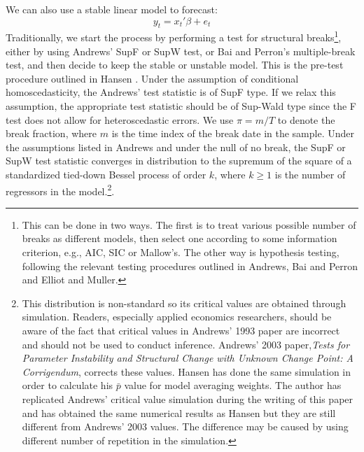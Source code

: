 We can also use a stable linear model to forecast:
\begin{equation}
	y_t = x_t'\beta + e_t
\end{equation}
Traditionally, we start the process by performing a test for structural breaks\footnote{This can be done in two ways. The first is to treat various possible number of breaks as different models, then select one according to some information criterion, e.g., AIC, SIC or Mallow's. The other way is hypothesis testing, following the relevant testing procedures outlined in Andrews\cite{andrews93}, Bai and Perron\cite{bai_perron98} and Elliot and Muller\cite{elliott_muller_RES2006}. }, either by using Andrews' SupF or SupW test, or Bai and Perron's multiple-break test, and then decide to keep the stable or unstable model. This is the pre-test procedure outlined in Hansen \cite{hansen2009averaging}. Under the assumption of conditional homoscedasticity, the Andrews' test statistic is of SupF type. If we relax this assumption, the appropriate test statistic should be of Sup-Wald type since the F test does not allow for heteroscedastic errors. We use $\pi = m/T$ to denote the break fraction, where $m$ is the time index of the break date in the sample. Under the assumptions listed in Andrews \cite{andrews93} and under the null of no break, the SupF or SupW test statistic converges in distribution to the supremum of the square of a standardized tied-down Bessel process of order $k$, where $k \geq 1$ is the number of regressors in the model.\footnote{This distribution is non-standard so its critical values are obtained through simulation. Readers, especially applied economics researchers, should be aware of the fact that critical values in Andrews' 1993 paper are incorrect and should not be used to conduct inference. Andrews' 2003 paper,\emph{Tests for Parameter Instability and Structural Change with Unknown Change Point: A Corrigendum}, corrects these values. Hansen \cite{hansen2009averaging} has done the same simulation in order to calculate his $\bar{p}$ value for model averaging weights. The author has replicated Andrews' critical value simulation during the writing of this paper and has obtained the same numerical results as Hansen but they are still different from Andrews' 2003 values. The difference may be caused by using different number of repetition in the simulation.}.
